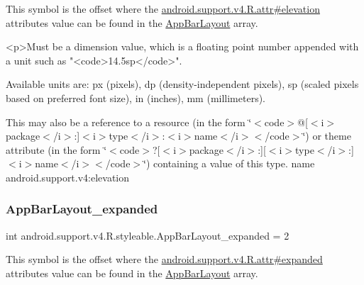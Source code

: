 This symbol is the offset where the \hyperlink{classandroid_1_1support_1_1v4_1_1R_1_1attr_a5906f91b859c693a38a88ad3b0be4a39}{android.\+support.\+v4.\+R.\+attr\#elevation} attribute\textquotesingle{}s value can be found in the \hyperlink{classandroid_1_1support_1_1v4_1_1R_1_1styleable_aa7c4e9c9d1655572bf8e4bfd804025c2}{App\+Bar\+Layout} array.

\begin{DoxyVerb}      <p>Must be a dimension value, which is a floating point number appended with a unit such as "<code>14.5sp</code>".
\end{DoxyVerb}
 Available units are\+: px (pixels), dp (density-\/independent pixels), sp (scaled pixels based on preferred font size), in (inches), mm (millimeters). 

This may also be a reference to a resource (in the form \char`\"{}$<$code$>$@\mbox{[}$<$i$>$package$<$/i$>$\+:\mbox{]}$<$i$>$type$<$/i$>$\+:$<$i$>$name$<$/i$>$$<$/code$>$\char`\"{}) or theme attribute (in the form \char`\"{}$<$code$>$?\mbox{[}$<$i$>$package$<$/i$>$\+:\mbox{]}\mbox{[}$<$i$>$type$<$/i$>$\+:\mbox{]}$<$i$>$name$<$/i$>$$<$/code$>$\char`\"{}) containing a value of this type.  name android.\+support.\+v4\+:elevation \mbox{\label{classandroid_1_1support_1_1v4_1_1R_1_1styleable_a2cbf1a78895b2153260cecf4522cd109}} 
\subsubsection{\texorpdfstring{App\+Bar\+Layout\+\_\+expanded}{AppBarLayout\_expanded}}
{\footnotesize\ttfamily int android.\+support.\+v4.\+R.\+styleable.\+App\+Bar\+Layout\+\_\+expanded = 2\hspace{0.3cm}{\ttfamily [static]}}

This symbol is the offset where the \hyperlink{classandroid_1_1support_1_1v4_1_1R_1_1attr_a2c4f03dade210005e1bf41ee7b9383b1}{android.\+support.\+v4.\+R.\+attr\#expanded} attribute\textquotesingle{}s value can be found in the \hyperlink{classandroid_1_1support_1_1v4_1_1R_1_1styleable_aa7c4e9c9d1655572bf8e4bfd804025c2}{App\+Bar\+Layout} array.

